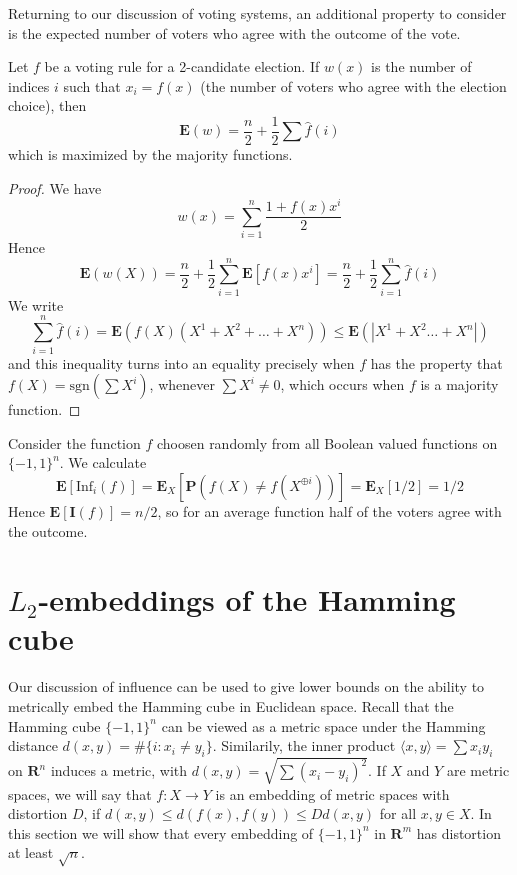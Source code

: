 Returning to our discussion of voting systems, an additional property to consider is the expected number of voters who agree with the outcome of the vote.

\begin{theorem}
    Let $f$ be a voting rule for a 2-candidate election. If $w(x)$ is the number of indices $i$ such that $x_i = f(x)$ (the number of voters who agree with the election choice), then
    \[ \mathbf{E}(w) = \frac{n}{2} + \frac{1}{2} \sum \widehat{f}(i) \]
    which is maximized by the majority functions.
\end{theorem}
\begin{proof}
    We have
    \[ w(x) = \sum_{i = 1}^n \frac{1 + f(x) x^i}{2} \]
    Hence
    \[ \mathbf{E}(w(X)) = \frac{n}{2} + \frac{1}{2} \sum_{i = 1}^n \mathbf{E}[f(x)x^i] = \frac{n}{2} + \frac{1}{2} \sum_{i = 1}^n \widehat{f}(i) \]
    We write
    \[ \sum_{i = 1}^n \widehat{f}(i) = \mathbf{E}(f(X)(X^1 + X^2 + \dots + X^n)) \leq \mathbf{E}(|X^1 + X^2 \dots + X^n|) \]
    and this inequality turns into an equality precisely when $f$ has the property that $f(X) = \text{sgn}(\sum X^i)$, whenever $\sum X^i \neq 0$, which occurs when $f$ is a majority function.
\end{proof}

\begin{example}
    Consider the function $f$ choosen randomly from all Boolean valued functions on $\{ -1, 1 \}^n$. We calculate
    \[ \mathbf{E}[\text{Inf}_i(f)] = \mathbf{E}_X[\mathbf{P}(f(X) \neq f(X^{\oplus i}))] = \mathbf{E}_X[1/2] = 1/2 \]
    Hence $\mathbf{E}[\mathbf{I}(f)] = n/2$, so for an average function half of the voters agree with the outcome.
\end{example}

\section{$L_2$-embeddings of the Hamming cube}

Our discussion of influence can be used to give lower bounds on the ability to metrically embed the Hamming cube in Euclidean space. Recall that the Hamming cube $\{ -1, 1 \}^n$ can be viewed as a metric space under the Hamming distance $d(x,y) = \# \{ i: x_i \neq y_i \}$. Similarily, the inner product $\langle x, y \rangle = \sum x_i y_i$ on $\mathbf{R}^n$ induces a metric, with $d(x,y) = \sqrt{\sum (x_i - y_i)^2}$. If $X$ and $Y$ are metric spaces, we will say that $f: X \to Y$ is an embedding of metric spaces with distortion $D$, if $d(x,y) \leq d(f(x), f(y)) \leq D d(x,y)$ for all $x, y \in X$. In this section we will show that every embedding of $\{ -1, 1 \}^n$ in $\mathbf{R}^m$ has distortion at least $\sqrt{n}$.

